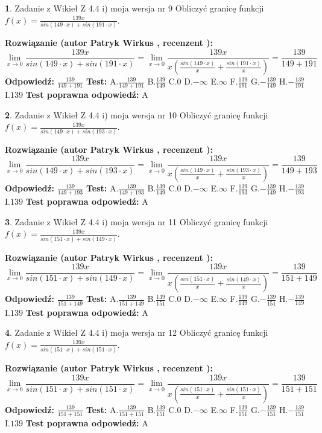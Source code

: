 \documentclass[12pt, a4paper]{article}
\theoremstyle{definition} %
\newtheorem{zad}{}
\newcommand{\zadStart}[1]{\begin{zad}#1\newline}
\newcommand{\zadStop}{\end{zad}}
\newcommand{\rozwStart}[2]{\noindent \textbf{Rozwiązanie (autor #1 , recenzent #2): }\newline}
\newcommand{\rozwStop}{\newline}
\newcommand{\odpStart}{\noindent \textbf{Odpowiedź:}\newline}
\newcommand{\odpStop}{\newline}
\newcommand{\testStart}{\noindent \textbf{Test:}\newline}
\newcommand{\testStop}{\newline}
\newcommand{\kluczStart}{\noindent \textbf{Test poprawna odpowiedź:}\newline}
\newcommand{\kluczStop}{\newline}
\begin{document}
\zadStart{Zadanie z Wikieł Z 4.4 i) moja wersja nr 9}
Obliczyć granicę funkcji $f(x)=\frac{139x}{sin(149\cdot x) +sin(191\cdot x)}$.
\zadStop
\rozwStart{Patryk Wirkus}{}
$$\lim\limits_{x\to 0}\frac{139x}{sin(149\cdot x) +sin(191\cdot x)}=\lim\limits_{x\to 0}\frac{139x}{x(\frac{sin(149\cdot x)}{x}+\frac{sin(191\cdot x)}{x})}=\frac{139}{149+191}$$
\rozwStop
\odpStart
$\frac{139}{149+191}$
\odpStop
\testStart
A.$\frac{139}{149+191}$
B.$\frac{139}{149}$
C.$0$
D.$-\infty$
E.$\infty$
F.$\frac{139}{191}$
G.$-\frac{139}{149}$
H.$-\frac{139}{191}$
I.$139$
\testStop
\kluczStart
A
\kluczStop



\zadStart{Zadanie z Wikieł Z 4.4 i) moja wersja nr 10}
Obliczyć granicę funkcji $f(x)=\frac{139x}{sin(149\cdot x) +sin(193\cdot x)}$.
\zadStop
\rozwStart{Patryk Wirkus}{}
$$\lim\limits_{x\to 0}\frac{139x}{sin(149\cdot x) +sin(193\cdot x)}=\lim\limits_{x\to 0}\frac{139x}{x(\frac{sin(149\cdot x)}{x}+\frac{sin(193\cdot x)}{x})}=\frac{139}{149+193}$$
\rozwStop
\odpStart
$\frac{139}{149+193}$
\odpStop
\testStart
A.$\frac{139}{149+193}$
B.$\frac{139}{149}$
C.$0$
D.$-\infty$
E.$\infty$
F.$\frac{139}{193}$
G.$-\frac{139}{149}$
H.$-\frac{139}{193}$
I.$139$
\testStop
\kluczStart
A
\kluczStop



\zadStart{Zadanie z Wikieł Z 4.4 i) moja wersja nr 11}
Obliczyć granicę funkcji $f(x)=\frac{139x}{sin(151\cdot x) +sin(149\cdot x)}$.
\zadStop
\rozwStart{Patryk Wirkus}{}
$$\lim\limits_{x\to 0}\frac{139x}{sin(151\cdot x) +sin(149\cdot x)}=\lim\limits_{x\to 0}\frac{139x}{x(\frac{sin(151\cdot x)}{x}+\frac{sin(149\cdot x)}{x})}=\frac{139}{151+149}$$
\rozwStop
\odpStart
$\frac{139}{151+149}$
\odpStop
\testStart
A.$\frac{139}{151+149}$
B.$\frac{139}{151}$
C.$0$
D.$-\infty$
E.$\infty$
F.$\frac{139}{149}$
G.$-\frac{139}{151}$
H.$-\frac{139}{149}$
I.$139$
\testStop
\kluczStart
A
\kluczStop



\zadStart{Zadanie z Wikieł Z 4.4 i) moja wersja nr 12}
Obliczyć granicę funkcji $f(x)=\frac{139x}{sin(151\cdot x) +sin(151\cdot x)}$.
\zadStop
\rozwStart{Patryk Wirkus}{}
$$\lim\limits_{x\to 0}\frac{139x}{sin(151\cdot x) +sin(151\cdot x)}=\lim\limits_{x\to 0}\frac{139x}{x(\frac{sin(151\cdot x)}{x}+\frac{sin(151\cdot x)}{x})}=\frac{139}{151+151}$$
\rozwStop
\odpStart
$\frac{139}{151+151}$
\odpStop
\testStart
A.$\frac{139}{151+151}$
B.$\frac{139}{151}$
C.$0$
D.$-\infty$
E.$\infty$
F.$\frac{139}{151}$
G.$-\frac{139}{151}$
H.$-\frac{139}{151}$
I.$139$
\testStop
\kluczStart
A
\kluczStop
\end{document}
